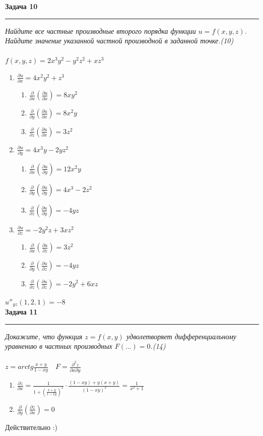\documentclass[a4paper,11pt]{article}
\begin{document}
\textbf{\large Задача 10}
\medskip\hrule\medskip
\textit{Найдите все частные производные второго порядка функции $ u = f(x, y, z) $. Найдите значение указанной частной производной в заданной точке.(10)} \\ \\
$ f(x, y, z) = 2x^3y^2 - y^2z^2 + xz^3 $
\begin{enumerate}
	\item 
	$ \frac{\partial u}{\partial x} = 4x^2y^2 + z^3 $
	\begin{enumerate}
		\item $ \frac{\partial}{\partial x}(\frac{\partial u}{\partial x}) = 8xy^2 $
		\item $ \frac{\partial}{\partial y}(\frac{\partial u}{\partial x}) = 8x^2y $
		\item $ \frac{\partial}{\partial z}(\frac{\partial u}{\partial x}) = 3z^2 $
	\end{enumerate}
	
	\item
	$ \frac{\partial u}{\partial y} = 4x^3y - 2yz^2 $
	\begin{enumerate}
		\item $ \frac{\partial}{\partial x}(\frac{\partial u}{\partial y}) = 12x^2y $ 
		\item $ \frac{\partial}{\partial y}(\frac{\partial u}{\partial y}) = 4x^3 - 2z^2 $
		\item $ \frac{\partial}{\partial z}(\frac{\partial u}{\partial y}) = -4yz $
	\end{enumerate}
	
	\item
	$ \frac{\partial u}{\partial z} = -2y^2z + 3xz^2 $
	\begin{enumerate}
		\item $ \frac{\partial}{\partial x}(\frac{\partial u}{\partial z}) = 3z^2 $
		\item $ \frac{\partial}{\partial y}(\frac{\partial u}{\partial z}) = -4yz $
		\item $ \frac{\partial}{\partial z}(\frac{\partial u}{\partial z}) = -2y^2 + 6xz $
	\end{enumerate}
\end{enumerate}
$ u''_{yz}(1, 2, 1) = -8 $
\\ 


\textbf{\large Задача 11}
\medskip\hrule\medskip
\textit{Докажите, что функция $ z = f(x, y) $  удволетворяет дифференциальному уравнению в частных производных $ F(\dots) = 0 $.(14)} \\ \\ 
$ z = arctg \frac{x + y}{1 - xy} \quad F = \frac{\partial^2 z}{\partial x \partial y}$
\begin{enumerate}
	\item $ \frac{\partial z}{\partial x} = \frac1{1 + (\frac{x + y}{1 - xy})^2}  \cdot 
	\frac{(1 - xy) + y(x + y)}{(1 - xy)^2} = \frac{1}{x^2 + 1} $
	
	\item $ \frac{\partial}{\partial y}(\frac{\partial z}{\partial x}) = 0 $
\end{enumerate}
Действительно :)
\newpage
\end{document}
